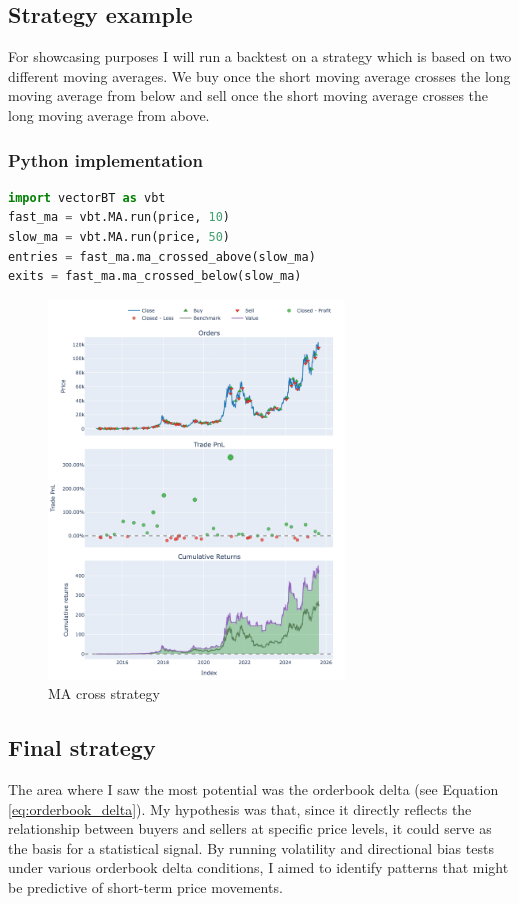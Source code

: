 \documentclass[12pt]{article}
\begin{document}
\newpage
\subsection{Strategy example}
For showcasing purposes I will run a backtest on a strategy which is based on two different moving averages. We buy once the short moving average crosses the long moving average from below and sell once the short moving average crosses the long moving average from above.


\subsubsection*{Python implementation}
\begin{lstlisting}[language=Python]
import vectorBT as vbt
fast_ma = vbt.MA.run(price, 10)
slow_ma = vbt.MA.run(price, 50)
entries = fast_ma.ma_crossed_above(slow_ma)
exits = fast_ma.ma_crossed_below(slow_ma)
\end{lstlisting}

\begin{figure}[h]
    \centering
    \includegraphics[width=0.7\textwidth]{imgs/strat_show_case_btc.png}
    \caption{MA cross strategy}
    \label{fig:ma_cross_strategy}
\end{figure}

\newpage

\subsection{Final strategy}
The area where I saw the most potential was the orderbook delta (see Equation \ref{eq:orderbook_delta}). My hypothesis was that, since it directly reflects the relationship between buyers and sellers at specific price levels, it could serve as the basis for a statistical signal. By running volatility and directional bias tests under various orderbook delta conditions, I aimed to identify patterns that might be predictive of short-term price movements.
\end{document}
